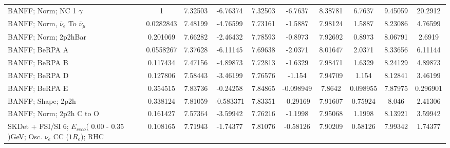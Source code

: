 \begin{tabular}{| l | S | S  S | S  S | S  S | S  S | }
                                                      BANFF; Norm; NC 1 $\gamma$ &               1 &         7.32503 &        -6.76374 &         7.32503 &         -6.7637 &         8.38781 &          6.7637 &         9.45059 &         20.2912 \\ 
                               BANFF; Norm, $\bar{\nu}_{e}$ To $\bar{\nu}_{\mu}$ &       0.0282843 &         7.48199 &        -4.76599 &         7.73161 &         -1.5887 &         7.98124 &          1.5887 &         8.23086 &         4.76599 \\ 
                                                            BANFF; Norm; 2p2hBar &        0.201069 &         7.66282 &        -2.46432 &         7.78593 &         -0.8973 &         7.92692 &          0.8973 &         8.06791 &          2.6919 \\ 
                                                                  BANFF; BeRPA A &       0.0558267 &         7.37628 &        -6.11145 &         7.69638 &         -2.0371 &         8.01647 &          2.0371 &         8.33656 &         6.11144 \\ 
                                                                  BANFF; BeRPA B &        0.117434 &         7.47156 &        -4.89873 &         7.72813 &         -1.6329 &         7.98471 &          1.6329 &         8.24129 &         4.89873 \\ 
                                                                  BANFF; BeRPA D &        0.127806 &         7.58443 &        -3.46199 &         7.76576 &          -1.154 &         7.94709 &           1.154 &         8.12841 &         3.46199 \\ 
                                                                  BANFF; BeRPA E &        0.354515 &         7.83736 &        -0.24258 &         7.84865 &       -0.098949 &          7.8642 &        0.098955 &         7.87975 &        0.296901 \\ 
                                                              BANFF; Shape; 2p2h &        0.338124 &         7.81059 &       -0.583371 &         7.83351 &        -0.29169 &         7.91607 &         0.75924 &           8.046 &         2.41306 \\ 
                                                        BANFF; Norm; 2p2h C to O &        0.161427 &         7.57364 &        -3.59942 &         7.76216 &         -1.1998 &         7.95068 &          1.1998 &         8.13921 &         3.59942 \\ 
SKDet + FSI/SI  6; $E_{reco}$( 0.00 - 0.35 )GeV; Osc. $\nu_{e}$ CC ($1R_{e}$); RHC &        0.108165 &         7.71943 &        -1.74377 &         7.81076 &        -0.58126 &         7.90209 &         0.58126 &         7.99342 &         1.74377 \\ 

\end{tabular}
